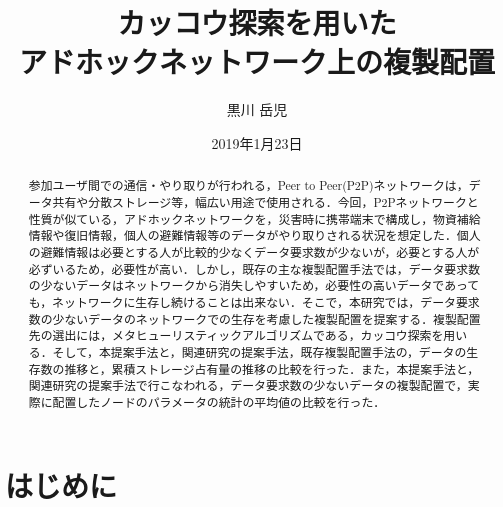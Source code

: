 \documentclass[11pt]{jreport}
\title{カッコウ探索を用いた\\
アドホックネットワーク上の複製配置}
\author{黒川 岳児}
\date{2019年1月23日}	%
\begin{document}
\maketitle

\begin{abstract}
参加ユーザ間での通信・やり取りが行われる，Peer to Peer(P2P)ネットワークは，データ共有や分散ストレージ等，幅広い用途で使用される．今回，P2Pネットワークと性質が似ている，アドホックネットワークを，災害時に携帯端末で構成し，物資補給情報や復旧情報，個人の避難情報等のデータがやり取りされる状況を想定した．個人の避難情報は必要とする人が比較的少なくデータ要求数が少ないが，必要とする人が必ずいるため，必要性が高い．しかし，既存の主な複製配置手法では，データ要求数の少ないデータはネットワークから消失しやすいため，必要性の高いデータであっても，ネットワークに生存し続けることは出来ない．そこで，本研究では，データ要求数の少ないデータのネットワークでの生存を考慮した複製配置を提案する．複製配置先の選出には，メタヒューリスティックアルゴリズムである，カッコウ探索を用いる．そして，本提案手法と，関連研究の提案手法，既存複製配置手法の，データの生存数の推移と，累積ストレージ占有量の推移の比較を行った．また，本提案手法と，関連研究の提案手法で行こなわれる，データ要求数の少ないデータの複製配置で，実際に配置したノードのパラメータの統計の平均値の比較を行った．
\end{abstract}

\tableofcontents

\listoffigures

\listoftables

\newpage
{}	%



\chapter{はじめに}
\end{document}
